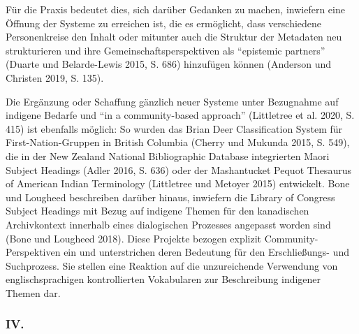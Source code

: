 \documentclass[a4paper,
fontsize=11pt,
oneside,
numbers=noperiodatend,
parskip=half-,
bibliography=totoc,
final
]{scrartcl}
\begin{document}
Für die Praxis bedeutet dies, sich darüber Gedanken zu machen, inwiefern
eine Öffnung der Systeme zu erreichen ist, die es ermöglicht, dass
verschiedene Personenkreise den Inhalt oder mitunter auch die Struktur
der Metadaten neu strukturieren und ihre Gemeinschaftsperspektiven als
\enquote{epistemic partners} (Duarte und Belarde-Lewis 2015, S. 686)
hinzufügen können (Anderson und Christen 2019, S. 135).

Die Ergänzung oder Schaffung gänzlich neuer Systeme unter Bezugnahme auf
indigene Bedarfe und \enquote{in a community-based approach} (Littletree
et al. 2020, S. 415) ist ebenfalls möglich: So wurden das Brian Deer
Classification System für First-Nation-Gruppen in British Columbia
(Cherry und Mukunda 2015, S. 549), die in der New Zealand National
Bibliographic Database integrierten Maori Subject Headings (Adler 2016,
S. 636) oder der Mashantucket Pequot Thesaurus of American Indian
Terminology (Littletree und Metoyer 2015) entwickelt. Bone und Lougheed
beschreiben darüber hinaus, inwiefern die Library of Congress Subject
Headings mit Bezug auf indigene Themen für den kanadischen Archivkontext
innerhalb eines dialogischen Prozesses angepasst worden sind (Bone und
Lougheed 2018). Diese Projekte bezogen explizit Community-Perspektiven
ein und unterstrichen deren Bedeutung für den Erschließungs- und
Suchprozess. Sie stellen eine Reaktion auf die unzureichende Verwendung
von englischsprachigen kontrollierten Vokabularen zur Beschreibung
indigener Themen dar.

\hypertarget{iv.}{%
\subsubsection{IV.}\label{iv.}}
\end{document}
